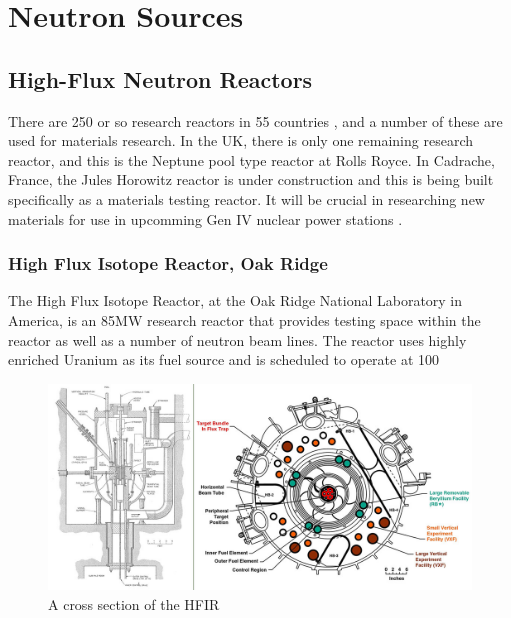 \section{Neutron Sources}

\subsection{High-Flux Neutron Reactors}

There are 250 or so research reactors in 55 countries \cite{researchreactorstats}, and a number of these are used for materials research.  In the UK, there is only one remaining research reactor, and this is the Neptune pool type reactor at Rolls Royce\cite{neptunereactor}.  In Cadrache, France, the Jules Horowitz reactor is under construction and this is being built specifically as a materials testing reactor.  It will be crucial in researching new materials for use in upcomming Gen IV nuclear power stations \cite{researchreactorstats}.  


\subsubsection{High Flux Isotope Reactor, Oak Ridge}

The High Flux Isotope Reactor, at the Oak Ridge National Laboratory in America, is an 85MW research reactor that provides testing space within the reactor as well as a number of neutron beam lines.  The reactor uses highly enriched Uranium as its fuel source and is scheduled to operate at 100%



\begin{figure}[tbp]
  \begin{center}
    \includegraphics[width=15.0cm]{chapters/background_activity/images/hfir-cross-sections.jpg}
    \caption{A cross section of the HFIR \cite{hfirornl}}
    \label{fig:hrirornlfig}
  \end{center}
\end{figure}


